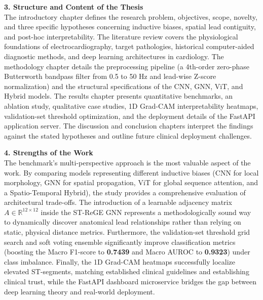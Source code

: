 \documentclass[12pt,a4paper]{article}
\begin{document}
\noindent
\textbf{3. Structure and Content of the Thesis} \\
The introductory chapter defines the research problem, objectives, scope, novelty, and three specific hypotheses concerning inductive biases, spatial lead contiguity, and post-hoc interpretability. The literature review covers the physiological foundations of electrocardiography, target pathologies, historical computer-aided diagnostic methods, and deep learning architectures in cardiology. The methodology chapter details the preprocessing pipeline (a 4th-order zero-phase Butterworth bandpass filter from 0.5 to 50 Hz and lead-wise Z-score normalization) and the structural specifications of the CNN, GNN, ViT, and Hybrid models. The results chapter presents quantitative benchmarks, an ablation study, qualitative case studies, 1D Grad-CAM interpretability heatmaps, validation-set threshold optimization, and the deployment details of the FastAPI application server. The discussion and conclusion chapters interpret the findings against the stated hypotheses and outline future clinical deployment challenges.
\vspace{1em}

\noindent
\textbf{4. Strengths of the Work} \\
The benchmark's multi-perspective approach is the most valuable aspect of the work. By comparing models representing different inductive biases (CNN for local morphology, GNN for spatial propagation, ViT for global sequence attention, and a Spatio-Temporal Hybrid), the study provides a comprehensive evaluation of architectural trade-offs. The introduction of a learnable adjacency matrix $A \in \mathbb{R}^{12 \times 12}$ inside the ST-ReGE GNN represents a methodologically sound way to dynamically discover anatomical lead relationships rather than relying on static, physical distance metrics. Furthermore, the validation-set threshold grid search and soft voting ensemble significantly improve classification metrics (boosting the Macro F1-score to \textbf{0.7439} and Macro AUROC to \textbf{0.9323}) under class imbalance. Finally, the 1D Grad-CAM heatmaps successfully localize elevated ST-segments, matching established clinical guidelines and establishing clinical trust, while the FastAPI dashboard microservice bridges the gap between deep learning theory and real-world deployment.
\vspace{1em}
\end{document}
